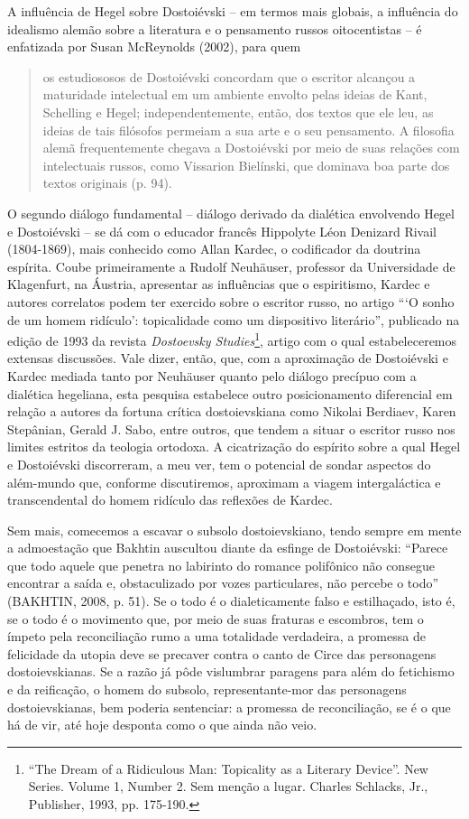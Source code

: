 A influência de Hegel sobre Dostoiévski -- em termos mais globais, a
influência do idealismo alemão sobre a literatura e o pensamento russos
oitocentistas -- é enfatizada por Susan McReynolds (2002), para quem

\begin{quote}
os estudiososos de Dostoiévski concordam que o escritor alcançou a
maturidade intelectual em um ambiente envolto pelas ideias de Kant,
Schelling e Hegel; independentemente, então, dos textos que ele leu, as
ideias de tais filósofos permeiam a sua arte e o seu pensamento. A
filosofia alemã frequentemente chegava a Dostoiévski por meio de suas
relações com intelectuais russos, como Vissarion Bielínski, que dominava
boa parte dos textos originais (p. 94).
\end{quote}

O segundo diálogo fundamental -- diálogo derivado da dialética
envolvendo Hegel e Dostoiévski -- se dá com o educador francês Hippolyte
Léon Denizard Rivail (1804-1869), mais conhecido como Allan Kardec, o
codificador da doutrina espírita. Coube primeiramente a Rudolf
Neuhäuser, professor da Universidade de Klagenfurt, na Áustria,
apresentar as influências que o espiritismo, Kardec e autores correlatos
podem ter exercido sobre o escritor russo, no artigo ```O sonho de um
homem ridículo': topicalidade como um dispositivo literário'', publicado
na edição de 1993 da revista \emph{Dostoevsky Studies}\footnote{``The
  Dream of a Ridiculous Man: Topicality as a Literary Device''. New
  Series. Volume 1, Number 2. Sem menção a lugar. Charles Schlacks, Jr.,
  Publisher, 1993, pp. 175-190.}, artigo com o qual estabeleceremos
extensas discussões. Vale dizer, então, que, com a aproximação de
Dostoiévski e Kardec mediada tanto por Neuhäuser quanto pelo diálogo
precípuo com a dialética hegeliana, esta pesquisa estabelece outro
posicionamento diferencial em relação a autores da fortuna crítica
dostoievskiana como Nikolai Berdiaev, Karen Stepânian, Gerald J. Sabo,
entre outros, que tendem a situar o escritor russo nos limites estritos
da teologia ortodoxa. A cicatrização do espírito sobre a qual Hegel e
Dostoiévski discorreram, a meu ver, tem o potencial de sondar aspectos
do além-mundo que, conforme discutiremos, aproximam a viagem
intergaláctica e transcendental do homem ridículo das reflexões de
Kardec.

Sem mais, comecemos a escavar o subsolo dostoievskiano, tendo sempre em
mente a admoestação que Bakhtin auscultou diante da esfinge de
Dostoiévski: ``Parece que todo aquele que penetra no labirinto do
romance polifônico não consegue encontrar a saída e, obstaculizado por
vozes particulares, não percebe o todo'' (BAKHTIN, 2008, p. 51). Se o
todo é o dialeticamente falso e estilhaçado, isto é, se o todo é o
movimento que, por meio de suas fraturas e escombros, tem o ímpeto pela
reconciliação rumo a uma totalidade verdadeira, a promessa de felicidade
da utopia deve se precaver contra o canto de Circe das personagens
dostoievskianas. Se a razão já pôde vislumbrar paragens para além do
fetichismo e da reificação, o homem do subsolo, representante-mor das
personagens dostoievskianas, bem poderia sentenciar: a promessa de
reconciliação, se é o que há de vir, até hoje desponta como o que ainda
não veio.

